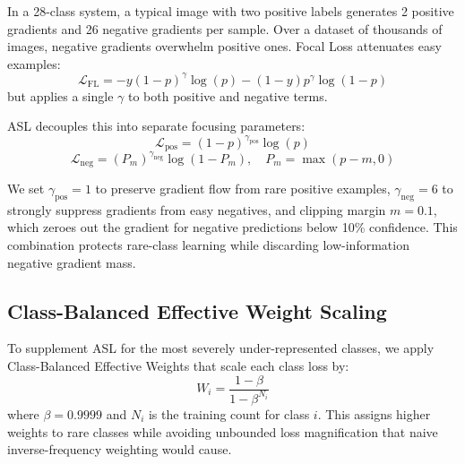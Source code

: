 \documentclass[conference]{IEEEtran}
\begin{document}
In a 28-class system, a typical image with two positive labels generates 2 positive gradients and 26 negative gradients per sample. Over a dataset of thousands of images, negative gradients overwhelm positive ones. Focal Loss \cite{lin2017focal} attenuates easy examples:
\begin{equation}
    \mathcal{L}_{\text{FL}} = -y (1-p)^\gamma \log(p) - (1-y) p^\gamma \log(1-p)
\end{equation}
but applies a single $\gamma$ to both positive and negative terms.

ASL \cite{ben2020asymmetric} decouples this into separate focusing parameters:
\begin{equation}
    \mathcal{L}_{\text{pos}} = (1-p)^{\gamma_{\text{pos}}} \log(p)
\end{equation}
\begin{equation}
    \mathcal{L}_{\text{neg}} = (P_m)^{\gamma_{\text{neg}}} \log(1-P_m), \quad P_m = \max(p - m, 0)
\end{equation}

We set $\gamma_{\text{pos}}{=}1$ to preserve gradient flow from rare positive examples, $\gamma_{\text{neg}}{=}6$ to strongly suppress gradients from easy negatives, and clipping margin $m{=}0.1$, which zeroes out the gradient for negative predictions below 10\% confidence. This combination protects rare-class learning while discarding low-information negative gradient mass.

\subsection{Class-Balanced Effective Weight Scaling}
To supplement ASL for the most severely under-represented classes, we apply Class-Balanced Effective Weights \cite{cui2019class} that scale each class loss by:
\begin{equation}
    W_i = \frac{1 - \beta}{1 - \beta^{N_i}}
\end{equation}
where $\beta{=}0.9999$ and $N_i$ is the training count for class $i$. This assigns higher weights to rare classes while avoiding unbounded loss magnification that naive inverse-frequency weighting would cause.
\end{document}
